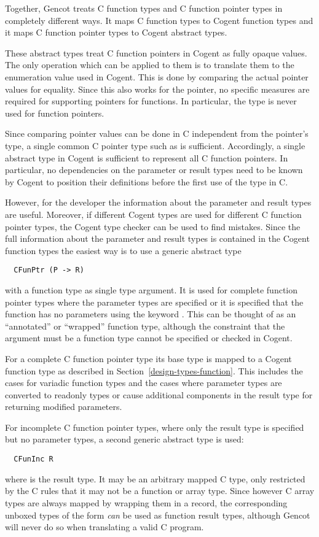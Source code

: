 Together, Gencot treats C function types and C function pointer types in completely different ways. It maps
C function types to Cogent function types and it maps C function pointer types to Cogent abstract types.

These abstract types treat C function pointers in Cogent as fully opaque values. The only operation which can 
be applied to them is to translate them to the enumeration value used in Cogent. This is done by comparing the
actual pointer values for equality. Since this also works for the  pointer, no specific measures
are required for supporting  pointers for functions. In particular, the type  is never
used for function pointers.

Since comparing pointer values can be done in C independent from the pointer's type, a single 
common C pointer type such as  is sufficient. Accordingly, a single abstract type in Cogent is
sufficient to represent all C function pointers. In particular, no dependencies on the parameter or result types 
need to be known by Cogent to position their definitions before the first use of the type in C. 

However, for the developer the information about the parameter and result types are useful. Moreover, if different
Cogent types are used for different C function pointer types, the Cogent type checker can be used to find
mistakes. Since the full information about the parameter and result types is contained in the Cogent function types
the easiest way is to use a generic abstract type
\begin{verbatim}
  CFunPtr (P -> R)
\end{verbatim}
with a function type  as single type argument. It is used for complete function pointer types where the 
parameter types are specified or it is specified that the function has no parameters using the keyword . 
This can be thought of as an ``annotated'' or ``wrapped'' function type, although the constraint that the argument
must be a function type cannot be specified or checked in Cogent.

For a complete C function pointer type its base type is mapped to a Cogent function type as described in
Section~\ref{design-types-function}. This includes the cases for variadic function types and the cases where
parameter types are converted to readonly types or cause additional components in the result type for returning 
modified parameters.

For incomplete C function pointer types, where only the result type
is specified but no parameter types, a second generic abstract type is used:
\begin{verbatim}
  CFunInc R
\end{verbatim}
where  is the result type. It may be an arbitrary 
mapped C type, only restricted by the C rules that it may not be a function or array type. Since however C array types
are always mapped by wrapping them in a record, the corresponding unboxed types of the form 
\textit{can} be used as function result types, although Gencot will never do so when translating a valid C program.

